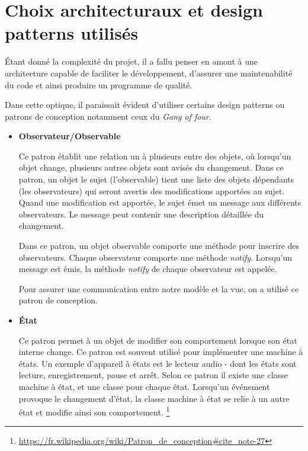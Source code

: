 \documentclass[10pt,a4paper]{book}
\begin{document}
\section{Choix architecturaux et design patterns utilisés}
Étant donné la complexité du projet, il a fallu penser en amont à une architecture capable de faciliter le développement, d'assurer une maintenabilité du code et ainsi produire un programme de qualité. 

Dans cette optique, il paraissait évident d'utiliser certains design patterns ou patrons de conception notamment ceux du \textit{Gang of four}.
\begin{itemize}
	\item \textbf{Observateur/Observable}
	
Ce patron établit une relation un à plusieurs entre des objets, où lorsqu'un objet change, plusieurs autres objets sont avisés du changement. Dans ce patron, un objet le sujet (l'observable) tient une liste des objets dépendants (les observateurs) qui seront avertis des modifications apportées au sujet. Quand une modification est apportée, le sujet émet un message aux différents observateurs. Le message peut contenir une description détaillée du changement. 

Dans ce patron, un objet observable comporte une méthode pour inscrire des observateurs. Chaque observateur comporte une méthode \textit{notify}. Lorsqu'un message est émis,  la méthode \textit{notify} de chaque observateur est appelée.

Pour assurer une communication entre notre modèle et la vue, on a utilisé ce patron de conception.

	\item{\textbf{État}
	
Ce patron permet à un objet de modifier son comportement lorsque son état interne change. Ce patron est souvent utilisé pour implémenter une machine à états. Un exemple d'appareil à états est le lecteur audio - dont les états sont lecture, enregistrement, pause et arrêt. Selon ce patron il existe une classe machine à état, et une classe pour chaque état. Lorsqu'un événement provoque le changement d'état, la classe machine à état se relie à un autre état et modifie ainsi son comportement.
\footnote{\url{https://fr.wikipedia.org/wiki/Patron_de_conception\#cite_note-27}}}
\end{itemize}
\newpage
\end{document}
